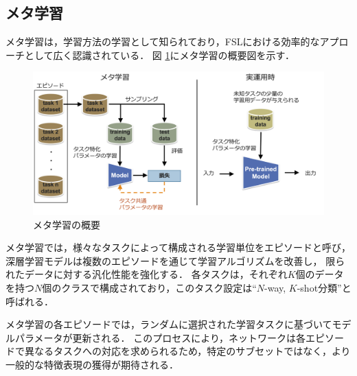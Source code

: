 \documentclass[a4paper,11pt,nomag]{jsreport}
\begin{document}
\subsection{メタ学習}

メタ学習は，学習方法の学習として知られており，FSLにおける効率的なアプローチとして広く認識されている．
図 \ref{fig:meta-learning}にメタ学習の概要図を示す．
% 
\begin{figure}[tbp]
  \centering
  \includegraphics[width=\linewidth, keepaspectratio]{image/meta-learning.png}
  \caption{メタ学習の概要}
  \label{fig:meta-learning}
\end{figure}
% 
メタ学習では，様々なタスクによって構成される学習単位をエピソードと呼び，深層学習モデルは複数のエピソードを通じて学習アルゴリズムを改善し，
限られたデータに対する汎化性能を強化する．
各タスクは，それぞれ$K$個のデータを持つ$N$個のクラスで構成されており，このタスク設定は``$N$-way, $K$-shot分類''と呼ばれる．

メタ学習の各エピソードでは，ランダムに選択された学習タスクに基づいてモデルパラメータが更新される．
このプロセスにより，ネットワークは各エピソードで異なるタスクへの対応を求められるため，特定のサブセットではなく，より一般的な特徴表現の獲得が期待される．
\end{document}
